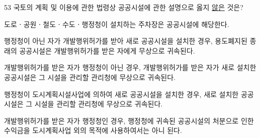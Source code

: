 \begin{question}{53}
국토의 계획 및 이용에 관한 법령상 공공시설에 관한 설명으로 옳지 \uline{않은} 것은?
\begin{choices}
  \item 도로ㆍ공원ㆍ철도ㆍ수도ㆍ행정청이 설치하는 주차장은 공공시설에 해당한다.
  \item 행정청이 아닌 자가 개발행위허가를 받아 새로 공공시설을 설치한 경우, 용도폐지된 종래의 공공시설은 개발행위허가를 받은 자에게 무상으로 귀속된다.
  \item 개발행위허가를 받은 자가 행정청이 아닌 경우, 개발행위허가를 받은 자가 새로 설치한 공공시설은 그 시설을 관리할 관리청에 무상으로 귀속된다.
  \item 행정청이 도시계획시설사업에 의하여 새로 공공시설을 설치한 경우, 새로 설치한 공공시설은 그 시설을 관리할 관리청에 무상으로 귀속된다.
  \item 개발행위허가를 받은 자가 행정청인 경우, 행정청에 귀속된 공공시설의 처분으로 인한 수익금을 도시계획사업 외의 목적에 사용하여서는 아니 된다.
\end{choices}
\end{question}
